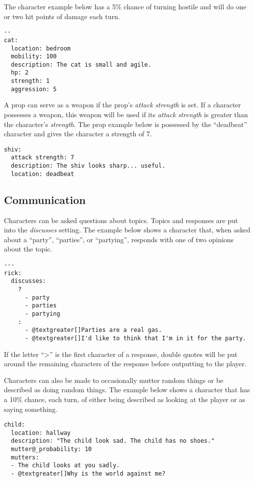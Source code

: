 \documentclass[letterpaper,10pt,english]{sphinxmanual}
\begin{document}
The character example below has a 5\% chance of turning hostile and will do one or two hit points of damage each turn.

\begin{Verbatim}[commandchars=@\[\]]
--
cat:
  location: bedroom
  mobility: 100
  description: The cat is small and agile.
  hp: 2
  strength: 1
  aggression: 5
\end{Verbatim}

A prop can serve as a weapon if the prop's \emph{attack strength} is set. If a character possesses a weapon, this weapon will be used if its \emph{attack strength} is greater than the character's \emph{strength}. The prop example below is possessed by the ``deadbeat'' character and gives the character a strength of 7.

\begin{Verbatim}[commandchars=@\[\]]
shiv:
  attack strength: 7
  description: The shiv looks sharp... useful.
  location: deadbeat
\end{Verbatim}


\subsection{Communication}
\label{elements:communication}
Characters can be asked questions about topics. Topics and responses are put into the \emph{discusses} setting. The example below shows a character that, when asked about a ``party'', ``parties'', or ``partying'', responds with one of two opinions about the topic.

\begin{Verbatim}[commandchars=@\[\]]
---
rick:
  discusses:
    ?
      - party
      - parties
      - partying
    :
      - @textgreater[]Parties are a real gas.
      - @textgreater[]I'd like to think that I'm in it for the party.
\end{Verbatim}

If the letter ``\textgreater{}'' is the first character of a response, double quotes will be put around the remaining characters of the response before outputting to the player.

Characters can also be made to occasionally mutter random things or be described as doing random things. The example below shows a character that has a 10\% chance, each turn, of either being described as looking at the player or as saying something.

\begin{Verbatim}[commandchars=@\[\]]
child:
  location: hallway
  description: "The child look sad. The child has no shoes."
  mutter@_probability: 10
  mutters:
  - The child looks at you sadly.
  - @textgreater[]Why is the world against me?
\end{Verbatim}
\end{document}
